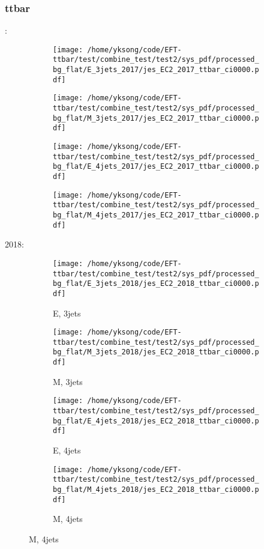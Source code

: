 \documentclass{beamer}
\begin{document}
\begin{frame}
\frametitle{ttbar}
\fontsize{5}{1}:
\begin{figure}
\centering
\begin{subfigure}[b]{0.24\textwidth}
\texttt{[image: /home/yksong/code/EFT-ttbar/test/combine\_test/test2/sys\_pdf/processed\_bg\_flat/E\_3jets\_2017/jes\_EC2\_2017\_ttbar\_ci0000.pdf]}
\end{subfigure}
\begin{subfigure}[b]{0.24\textwidth}
\texttt{[image: /home/yksong/code/EFT-ttbar/test/combine\_test/test2/sys\_pdf/processed\_bg\_flat/M\_3jets\_2017/jes\_EC2\_2017\_ttbar\_ci0000.pdf]}
\end{subfigure}
\begin{subfigure}[b]{0.24\textwidth}
\texttt{[image: /home/yksong/code/EFT-ttbar/test/combine\_test/test2/sys\_pdf/processed\_bg\_flat/E\_4jets\_2017/jes\_EC2\_2017\_ttbar\_ci0000.pdf]}
\end{subfigure}
\begin{subfigure}[b]{0.24\textwidth}
\texttt{[image: /home/yksong/code/EFT-ttbar/test/combine\_test/test2/sys\_pdf/processed\_bg\_flat/M\_4jets\_2017/jes\_EC2\_2017\_ttbar\_ci0000.pdf]}
\end{subfigure}
\end{figure}
2018:
\begin{figure}
\centering
\begin{subfigure}[b]{0.24\textwidth}
\texttt{[image: /home/yksong/code/EFT-ttbar/test/combine\_test/test2/sys\_pdf/processed\_bg\_flat/E\_3jets\_2018/jes\_EC2\_2018\_ttbar\_ci0000.pdf]}
\captionsetup{font=tiny}
\caption{E, 3jets}
\end{subfigure}
\begin{subfigure}[b]{0.24\textwidth}
\texttt{[image: /home/yksong/code/EFT-ttbar/test/combine\_test/test2/sys\_pdf/processed\_bg\_flat/M\_3jets\_2018/jes\_EC2\_2018\_ttbar\_ci0000.pdf]}
\captionsetup{font=tiny}
\caption{M, 3jets}
\end{subfigure}
\begin{subfigure}[b]{0.24\textwidth}
\texttt{[image: /home/yksong/code/EFT-ttbar/test/combine\_test/test2/sys\_pdf/processed\_bg\_flat/E\_4jets\_2018/jes\_EC2\_2018\_ttbar\_ci0000.pdf]}
\captionsetup{font=tiny}
\caption{E, 4jets}
\end{subfigure}
\begin{subfigure}[b]{0.24\textwidth}
\texttt{[image: /home/yksong/code/EFT-ttbar/test/combine\_test/test2/sys\_pdf/processed\_bg\_flat/M\_4jets\_2018/jes\_EC2\_2018\_ttbar\_ci0000.pdf]}
\captionsetup{font=tiny}
\caption{M, 4jets}
\end{subfigure}
\end{figure}
\end{frame}
\end{document}
